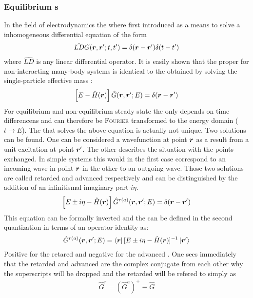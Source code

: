 \subsubsection{Equilibrium \cgfnc s}
In the field of electrodynamics the \gfnc{} where first introduced as a means to solve a inhomogeneous differential equation of the form
\begin{align}
\hat{LD}G(\boldsymbol{r},\boldsymbol{r}';t,t') = \delta(\boldsymbol{r}-\boldsymbol{r}')\delta(t-t')
\label{eqn:lineardiff}
\end{align}
where $\hat{LD}$ is any linear differential operator. It  is easily shown that the proper \gfnc{} for non-interacting many-body systems is identical to the \gfnc{} obtained by solving the single-particle effective mass \sdg{} \cite{ferry1999transport}:
\begin{align}
\left[ E -\hat{H}(\boldsymbol{r})\right] \hat{G}(\boldsymbol{r},\boldsymbol{r}';E) = \delta (\boldsymbol{r}-\boldsymbol{r}')
\end{align}
For equilibrium \cite{fetter2003quantum} and non-equilibrium steady state \cite{haug2008quantum} the \gfnc{} only depends on time differencens and can therefore be \textsc{Fourier} transformed to the energy domain ($t \rightarrow E$). The \gfnc{} that solves the above equation is actually not unique. Two solutions can be found. One can be considered a wavefunction at point $\boldsymbol{r}$ as a result from a unit excitation at point $\boldsymbol{r}'$. The other describes the situation with the points exchanged. In simple systems this would in the first case correspond to an incoming wave in point $\boldsymbol{r}$ in the other to an outgoing wave.
Those two solutions are called retarded and advanced \gfnc{} respectively and can be distinguished by the addition of an infinitismal imaginary part $i\eta$.
\begin{align}
\left[ E \pm i \eta -\hat{H}(\boldsymbol{r})\right] \hat{G}^{r(a)}(\boldsymbol{r},\boldsymbol{r}';E) = \delta (\boldsymbol{r}-\boldsymbol{r}')
\end{align}
This equation can be formally inverted and the \gfnc{} can be defined in the second quantization in terms of an operator identity as:
\begin{align}
\hat{G}^{r(a)}(\boldsymbol{r},\boldsymbol{r}';E) = \left< \boldsymbol{r} \right| [E\pm i \eta - \hat{H}(\boldsymbol{r})]^{-1} \left| \boldsymbol{r}' \right>
\end{align}
Positive for the retared and negative for the advanced \gfnc{}. One sees immediately that the retarded and advanced \gfnc{} are the complex conjugate from each other why the superscripts will be dropped and the retarded \gfnc{} will be refered to simply as \gfnc{}
\begin{align}
\hat{G}^r = (\hat{G}^a)^+ \equiv \hat{G}
\end{align}
